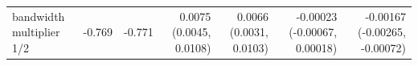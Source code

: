\begin{tabular}{lrrrrrr}
bandwidth multiplier 1/2 & -0.769 & -0.771 & 0.0075 (0.0045, 0.0108) & 0.0066 (0.0031, 0.0103) & -0.00023 (-0.00067, 0.00018) & -0.00167 (-0.00265, -0.00072) \\

\end{tabular}
